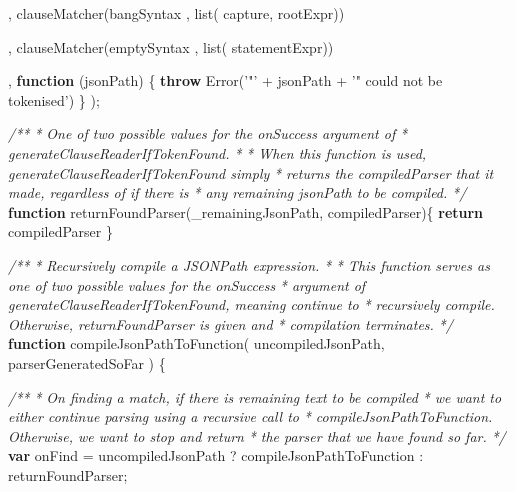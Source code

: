 \documentclass[12pt, ]{article}
\newenvironment{Shaded}{}{}
\newcommand{\KeywordTok}[1]{\textcolor[rgb]{0.00,0.44,0.13}{\textbf{{#1}}}}
\newcommand{\StringTok}[1]{\textcolor[rgb]{0.25,0.44,0.63}{{#1}}}
\newcommand{\CommentTok}[1]{\textcolor[rgb]{0.38,0.63,0.69}{\textit{{#1}}}}
\newcommand{\FunctionTok}[1]{\textcolor[rgb]{0.02,0.16,0.49}{{#1}}}
\newcommand{\NormalTok}[1]{{#1}}
\begin{document}
\begin{Shaded}
\begin{Highlighting}[]
   \NormalTok{,  }\FunctionTok{clauseMatcher}\NormalTok{(bangSyntax       , }\FunctionTok{list}\NormalTok{( capture,}
                                             \NormalTok{rootExpr))}
                                                          
   \NormalTok{,  }\FunctionTok{clauseMatcher}\NormalTok{(emptySyntax      , }\FunctionTok{list}\NormalTok{( statementExpr))}
   
   \NormalTok{,  }\KeywordTok{function} \NormalTok{(jsonPath) \{}
         \KeywordTok{throw} \FunctionTok{Error}\NormalTok{(}\StringTok{'"'} \NormalTok{+ jsonPath + }\StringTok{'" could not be tokenised'}\NormalTok{)      }
      \NormalTok{\}}
   \NormalTok{);}


   \CommentTok{/**}
\CommentTok{    * One of two possible values for the onSuccess argument of }
\CommentTok{    * generateClauseReaderIfTokenFound.}
\CommentTok{    * }
\CommentTok{    * When this function is used, generateClauseReaderIfTokenFound simply }
\CommentTok{    * returns the compiledParser that it made, regardless of if there is }
\CommentTok{    * any remaining jsonPath to be compiled.}
\CommentTok{    */}
   \KeywordTok{function} \FunctionTok{returnFoundParser}\NormalTok{(_remainingJsonPath, compiledParser)\{ }
      \KeywordTok{return} \NormalTok{compiledParser }
   \NormalTok{\}     }
              
   \CommentTok{/**}
\CommentTok{    * Recursively compile a JSONPath expression.}
\CommentTok{    * }
\CommentTok{    * This function serves as one of two possible values for the onSuccess }
\CommentTok{    * argument of generateClauseReaderIfTokenFound, meaning continue to}
\CommentTok{    * recursively compile. Otherwise, returnFoundParser is given and}
\CommentTok{    * compilation terminates.}
\CommentTok{    */}
   \KeywordTok{function} \FunctionTok{compileJsonPathToFunction}\NormalTok{( uncompiledJsonPath, }
                                       \NormalTok{parserGeneratedSoFar ) \{}

      \CommentTok{/**}
\CommentTok{       * On finding a match, if there is remaining text to be compiled}
\CommentTok{       * we want to either continue parsing using a recursive call to }
\CommentTok{       * compileJsonPathToFunction. Otherwise, we want to stop and return }
\CommentTok{       * the parser that we have found so far.}
\CommentTok{       */}
      \KeywordTok{var} \NormalTok{onFind =      uncompiledJsonPath}
                     \NormalTok{?  compileJsonPathToFunction }
                     \NormalTok{:  returnFoundParser;}
                   

\end{Highlighting}
\end{Shaded}
\end{document}
